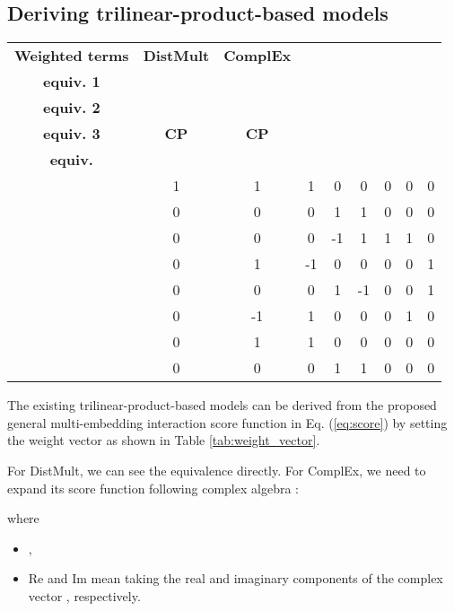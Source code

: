 \documentclass[sigconf,edbt]{acmart-edbt2019}
\begin{document}
\subsection{Deriving trilinear-product-based models}
\begin{table*}[ht]
\centering
	
	\caption{Weight vectors for special cases.}
	\label{tab:weight_vector}
	
	\begin{tabular}{c|c|c|c|c|c|c|c|c}
		\hline 
		\textbf{Weighted terms} & \textbf{DistMult} & \textbf{ComplEx} & \makecell{\textbf{ComplEx} \\\textbf{equiv. 1}} & \makecell{\textbf{ComplEx} \\\textbf{equiv. 2}} & \makecell{\textbf{ComplEx} \\\textbf{equiv. 3}} & \textbf{CP} & \textbf{CP} & \makecell{\textbf{CP} \\\textbf{equiv.}}\\ 
		\hline
		
		 & 1 & 1 & 1 & 0 & 0 & 0 & 0 & 0\\ 
		 & 0 & 0 & 0 & 1 & 1 & 0 & 0 & 0\\ 
		 & 0 & 0 & 0 & -1 & 1 & 1 & 1 & 0\\ 
		 & 0 & 1 & -1 & 0 & 0 & 0 & 0 & 1\\ 
		 & 0 & 0 & 0 & 1 & -1 & 0 & 0 & 1\\ 
		 & 0 & -1 & 1 & 0 & 0 & 0 & 1 & 0\\ 
		 & 0 & 1 & 1 & 0 & 0 & 0 & 0 & 0\\ 
		 & 0 & 0 & 0 & 1 & 1 & 0 & 0 & 0\\ 
		\hline 
	\end{tabular}
\end{table*}

The existing trilinear-product-based models can be derived from the proposed general multi-embedding interaction score function in Eq. (\ref{eq:score}) by setting the weight vector  as shown in Table \ref{tab:weight_vector}. 

For DistMult, we can see the equivalence directly. For ComplEx, we need to expand its score function following complex algebra \cite{ahlfors_complexanalysisintroduction_1953}:

where 
\begin{itemize}
	\item ,
	\item Re and Im mean taking the real and imaginary components of the complex vector , respectively.
\end{itemize}
\end{document}
